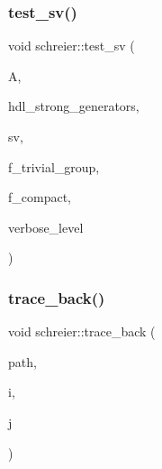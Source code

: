 \mbox{\label{classschreier_a3126deca325fbd23f1b7f03a1ef89dae}} 
\subsubsection{\texorpdfstring{test\+\_\+sv()}{test\_sv()}}
{\footnotesize\ttfamily void schreier\+::test\+\_\+sv (\begin{DoxyParamCaption}\item[{\mbox{\hyperlink{classaction}{action}} $\ast$}]{A,  }\item[{\mbox{\hyperlink{galois_8h_a09fddde158a3a20bd2dcadb609de11dc}{I\+NT}} $\ast$}]{hdl\+\_\+strong\+\_\+generators,  }\item[{\mbox{\hyperlink{galois_8h_a09fddde158a3a20bd2dcadb609de11dc}{I\+NT}} $\ast$}]{sv,  }\item[{\mbox{\hyperlink{galois_8h_a09fddde158a3a20bd2dcadb609de11dc}{I\+NT}}}]{f\+\_\+trivial\+\_\+group,  }\item[{\mbox{\hyperlink{galois_8h_a09fddde158a3a20bd2dcadb609de11dc}{I\+NT}}}]{f\+\_\+compact,  }\item[{\mbox{\hyperlink{galois_8h_a09fddde158a3a20bd2dcadb609de11dc}{I\+NT}}}]{verbose\+\_\+level }\end{DoxyParamCaption})}

\mbox{\label{classschreier_a584db152dcbed43b5d2e036bb8146b94}} 
\subsubsection{\texorpdfstring{trace\+\_\+back()}{trace\_back()}}
{\footnotesize\ttfamily void schreier\+::trace\+\_\+back (\begin{DoxyParamCaption}\item[{\mbox{\hyperlink{galois_8h_a09fddde158a3a20bd2dcadb609de11dc}{I\+NT}} $\ast$}]{path,  }\item[{\mbox{\hyperlink{galois_8h_a09fddde158a3a20bd2dcadb609de11dc}{I\+NT}}}]{i,  }\item[{\mbox{\hyperlink{galois_8h_a09fddde158a3a20bd2dcadb609de11dc}{I\+NT}} \&}]{j }\end{DoxyParamCaption})}

\mbox{\label{classschreier_af3b4f9632d21b92be2dc87c98f8429f3}} 

